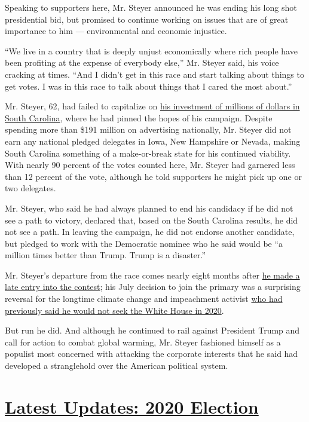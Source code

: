 Speaking to supporters here, Mr. Steyer announced he was ending his long
shot presidential bid, but promised to continue working on issues that
are of great importance to him --- environmental and economic injustice.

``We live in a country that is deeply unjust economically where rich
people have been profiting at the expense of everybody else,'' Mr.
Steyer said, his voice cracking at times. ``And I didn't get in this
race and start talking about things to get votes. I was in this race to
talk about things that I cared the most about.''

Mr. Steyer, 62, had failed to capitalize on
\href{https://www.nytimes.com/2020/01/25/us/politics/tom-steyer-millions-south-carolina.html}{his
investment of millions of dollars in South Carolina}, where he had
pinned the hopes of his campaign. Despite spending more than \$191
million on advertising nationally, Mr. Steyer did not earn any national
pledged delegates in Iowa, New Hampshire or Nevada, making South
Carolina something of a make-or-break state for his continued viability.
With nearly 90 percent of the votes counted here, Mr. Steyer had
garnered less than 12 percent of the vote, although he told supporters
he might pick up one or two delegates.

Mr. Steyer, who said he had always planned to end his candidacy if he
did not see a path to victory, declared that, based on the South
Carolina results, he did not see a path. In leaving the campaign, he did
not endorse another candidate, but pledged to work with the Democratic
nominee who he said would be ``a million times better than Trump. Trump
is a disaster.''

Mr. Steyer's departure from the race comes nearly eight months after
\href{https://www.nytimes.com/2019/07/09/us/politics/tom-steyer-president.html}{he
made a late entry into the contest}; his July decision to join the
primary was a surprising reversal for the longtime climate change and
impeachment activist
\href{https://www.nytimes.com/2019/01/09/us/politics/tom-steyer-trump-2020.html}{who
had previously said he would not seek the White House in 2020}.

But run he did. And although he continued to rail against President
Trump and call for action to combat global warming, Mr. Steyer fashioned
himself as a populist most concerned with attacking the corporate
interests that he said had developed a stranglehold over the American
political system.

\hypertarget{latest-updates-2020-election}{%
\section{\texorpdfstring{\href{https://www.nytimes.com/2020/07/31/us/elections/biden-vs-trump.html?action=click\&pgtype=Article\&state=default\&region=MAIN_CONTENT_1\&context=storylines_live_updates}{Latest
Updates: 2020
Election}}{Latest Updates: 2020 Election}}\label{latest-updates-2020-election}}

